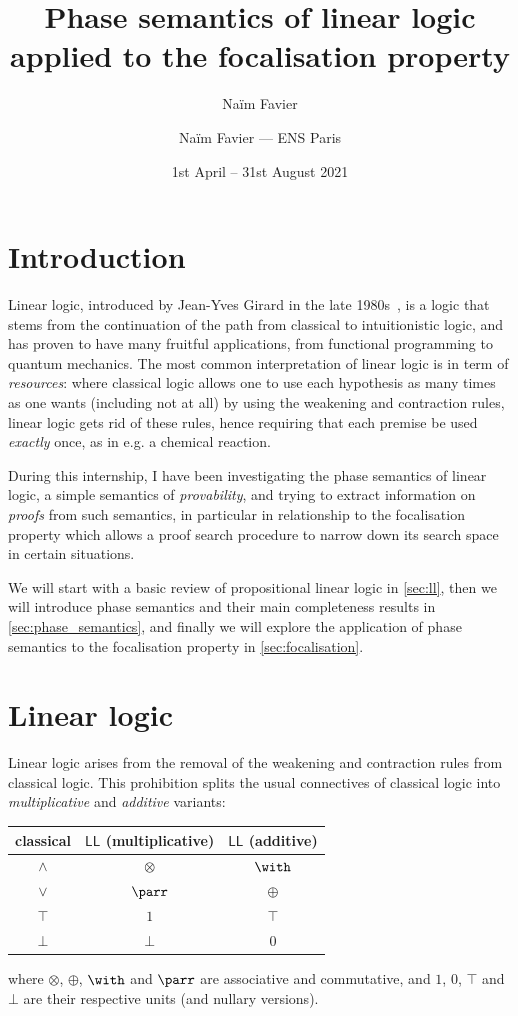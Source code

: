 \documentclass[11pt]{article}
\author{Naïm Favier}
\title{\huge\sc Phase semantics of linear logic applied to the focalisation property}
\author{Naïm Favier --- ENS Paris}
\date{1st April -- 31st August 2021}
\newcommand\LL{\textsf{LL}}
\newcommand\0{\textbf{0}}
\newcommand\1{\textbf{1}}
\begin{document}
\maketitle

\section{Introduction}

{\sc Linear logic}, introduced by Jean-Yves Girard in the late 1980s~\cite{ll}, is a logic that stems from
the continuation of the path from classical to intuitionistic logic,
and has proven to have many fruitful applications, from functional programming to quantum mechanics.
The most common interpretation of linear logic is in term of \emph{resources}: where classical logic allows one to use
each hypothesis as many times as one wants (including not at all) by using the weakening and contraction rules,
linear logic gets rid of these rules, hence requiring that each premise be used \emph{exactly} once, as in e.g. a chemical reaction.

During this internship, I have been investigating the phase semantics of linear logic, a simple semantics
of \emph{provability}, and trying to extract information on \emph{proofs} from such semantics, in particular in relationship
to the focalisation property which allows a proof search procedure to narrow down its search space in certain situations.

We will start with a basic review of propositional linear logic in \cref{sec:ll}, then we will introduce phase semantics and their main
completeness results in \cref{sec:phase_semantics}, and finally we will explore the application of phase semantics
to the focalisation property in \cref{sec:focalisation}.

\section{\label{sec:ll}Linear logic}

Linear logic arises from the removal of the weakening and contraction rules from classical logic.
This prohibition splits the usual connectives of classical logic into
\emph{multiplicative} and \emph{additive} variants:
\begin{center}
    \begin{tabular}{c|c|c}
        classical & $\LL$ (multiplicative) & $\LL$ (additive) \\
        \hline
        $\land$ & $\otimes$ & $\with$ \\
        $\lor$ & $\parr$ & $\oplus$ \\
        $\top$ & $1$ & $\top$ \\
        $\bot$ & $\bot$ & $0$
    \end{tabular}
\end{center}
where $\otimes$, $\oplus$, $\with$ and $\parr$ are associative and commutative, and $1$, $0$, $\top$ and $\bot$ are
their respective units (and nullary versions).
\end{document}
